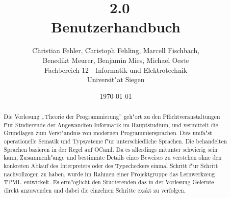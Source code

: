\documentclass[a4paper,fleqn,latin1,twoside,12pt]{report}
\title{{\Huge \TPML\ 2.0}\\Benutzerhandbuch}
\author{{\Large Christian Fehler, Christoph Fehling, Marcell Fischbach,}\\{\Large Benedikt Meurer, Benjamin Mies, Michael Oeste}\\Fachbereich 12 - Informatik und Elektrotechnik\\Universit"at Siegen}
\date{\small\today}
\newcommand{\TPML}{\textsf{\textmd{TPML}}}
\begin{document}
\maketitle

\begin{abstract}
Die Vorlesung ,,Theorie der Programmierung'' geh"ort zu den Pflichtveranstaltungen
f"ur Studierende der Angewandten Informatik im Hauptstudium, und vermittelt die Grundlagen
zum Verst"andnis von modernen Programmiersprachen. Dies umfa"st operationelle Sematik und
Typsysteme f"ur unterschiedliche Sprachen. Die behandelten Sprachen basieren in der Regel
auf OCaml. Da es allerdings mitunter schwierig sein kann, Zusammenh"ange und bestimmte Details
eines Beweises zu verstehen ohne den konkreten Ablauf des Interpreters oder des Typecheckers
einmal Schritt f"ur Schritt nachvollzogen zu haben, wurde im Rahmen einer Projektgruppe das
Lernwerkzeug \TPML\ entwickelt. Es erm"oglicht den Studierenden das in der Vorlesung Gelernte
direkt anzuwenden und dabei die einzelnen Schritte exakt zu verfolgen.
\end{abstract}

\tableofcontents
\newpage









\begin{appendix}

\end{appendix}

\printindex
\end{document}
